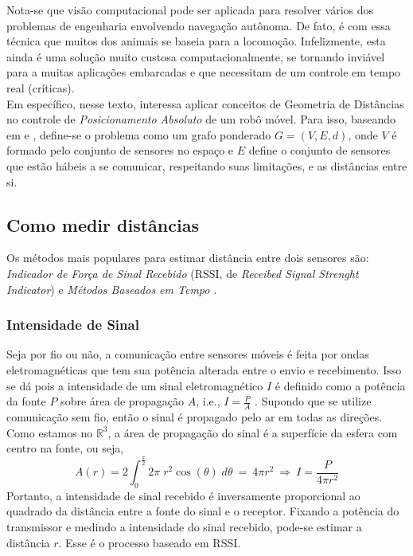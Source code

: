 Nota-se que visão computacional pode ser aplicada para resolver vários dos problemas de engenharia envolvendo navegação autônoma. De fato, é com essa técnica que muitos dos animais se baseia para a locomoção. Infelizmente, esta ainda é uma solução muito custosa computacionalmente, se tornando inviável para a muitas aplicações embarcadas \cite{bayro2010geometric} e que necessitam de um controle em tempo real (críticas).
\\

Em específico, nesse texto, interessa aplicar conceitos de Geometria de Distâncias no controle de \textit{Posicionamento Absoluto} de um robô móvel. Para isso, baseando em \cite{eren2004rigidity} e \cite{savvides2001dynamic}, define-se o problema como um grafo ponderado $G = (V,E,d)$, onde $V$ é formado pelo conjunto de sensores no espaço e $E$ define o conjunto de sensores que estão hábeis a se comunicar, respeitando suas limitações, e as distâncias entre si.

\subsection{Como medir distâncias\label{sec:sensores}}

Os métodos mais populares para estimar distância entre dois sensores são: \textit{Indicador de Força de Sinal Recebido} (RSSI, de \textit{Receibed Signal Strenght Indicator}) e \textit{Métodos Baseados em Tempo} \cite{savvides2001dynamic}.

\subsubsection{Intensidade de Sinal}
Seja por fio ou não, a comunicação entre sensores móveis é feita por ondas eletromagnéticas que tem sua potência alterada entre o envio e recebimento. Isso se dá pois a intensidade de um sinal eletromagnético $I$ é definido como a potência da fonte $P$ sobre área de propagação $A$, i.e., $I = \frac{P}{A}$ \cite{moysesEletromag}. Supondo que se utilize comunicação sem fio, então o sinal é propagado pelo ar em todas as direções. Como estamos no $\mathbb{R}^3$, a área de propagação do sinal é a superfície da esfera com centro na fonte, ou seja, 
$$ A(r) = 2\int_0^{\frac{\pi}{2}} 2\pi\; r^2 \cos(\theta) \; d\theta \ = \ 4\pi r^2 \ \Rightarrow \ I = \frac{P}{4\pi r^2} $$
Portanto, a intensidade de sinal recebido é inversamente proporcional ao quadrado da distância entre a fonte do sinal e o receptor. Fixando a potência do transmissor e medindo a intensidade do sinal recebido, pode-se estimar a distância $r$. Esse é o processo baseado em RSSI.
\\

